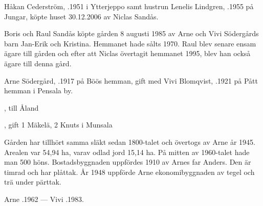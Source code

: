 %



%
Håkan Cederström, .1951 i Ytterjeppo samt hustrun Lenelis Lindgren, .1955 på Jungar, köpte huset 30.12.2006 av Niclas Sandås.\jhvspace{}

%
Boris och Raul Sandås köpte gården 8 augusti 1985 av Arne och Vivi Södergårds barn Jan-Erik och Kristina. Hemmanet hade sålts 1970. Raul blev senare ensam ägare till gården och efter att Niclas övertagit hemmanet 1995, blev han också ägare till denna gård.\jhvspace{}


%
Arne Södergård, .1917 på Böös hemman, gift med Vivi Blomqvist, .1921 på Pått hemman i Pensala by.
\begin{jhchildren}
  \item {}, till Åland
  \item {}, gift 1 Mäkelä, 2 Knuts i Munsala
  \item {}
\end{jhchildren}

Gården har tillhört samma släkt sedan 1800-talet och övertogs av Arne år 1945. Arealen var 54,94 ha, varav odlad jord 15,14 ha. På mitten av 1960-talet hade man 500 höns. Bostadsbyggnaden  uppfördes 1910 av Arnes far Anders. Den är timrad och har plåttak. År 1948 uppförde Arne ekonomibyggnaden av tegel och trä under pärttak.

Arne .1962  ---  Vivi .1983.



